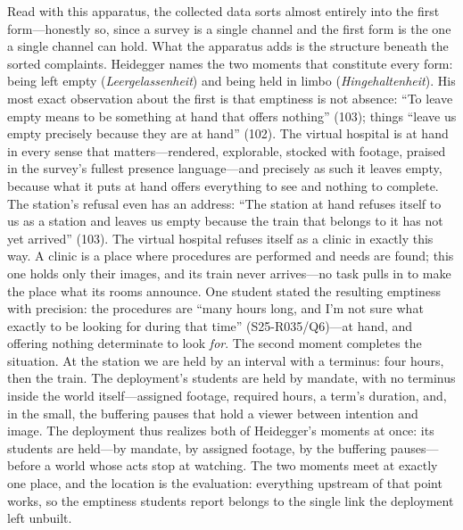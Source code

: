 Read with this apparatus, the collected data sorts almost
entirely into the first form---honestly so, since a survey is a
single channel and the first form is the one a single channel can
hold. What the apparatus adds is the structure beneath the sorted
complaints. Heidegger names the two moments that constitute every
form: being left empty (\textit{Leergelassenheit}) and being held in
limbo (\textit{Hingehaltenheit}). His most exact observation about the
first is that emptiness is not absence: ``To leave empty means to be
something at hand that offers nothing'' (103); things ``leave us empty
precisely because they are at hand'' (102). The virtual hospital is at
hand in every sense that matters---rendered, explorable, stocked with
footage, praised in the survey's fullest presence language---and
precisely as such it leaves empty, because what it puts at hand offers
everything to see and nothing to complete. The station's refusal even
has an address: ``The station at hand refuses itself to us as a
station and leaves us empty because the train that belongs to it has
not yet arrived'' (103). The virtual hospital refuses itself as a
clinic in exactly this way. A clinic is a place where procedures are
performed and needs are found; this one holds only their images, and
its train never arrives---no task pulls in to make the place what its
rooms announce. One student stated the resulting emptiness with
precision: the procedures are ``many hours long, and I'm not sure what
exactly to be looking for during that time'' (S25-R035/Q6)---at hand,
and offering nothing determinate to look \textit{for}. The second
moment completes the situation. At the station we are held by an
interval with a terminus: four hours, then the train. The deployment's
students are held by mandate, with no terminus inside the world
itself---assigned footage, required hours, a term's duration, and, in
the small, the buffering pauses that hold a viewer between intention
and image. The deployment thus realizes both of Heidegger's moments at
once: its students are held---by mandate, by assigned footage, by the
buffering pauses---before a world whose acts stop at watching. The two
moments meet at exactly one place, and the location is the evaluation:
everything upstream of that point works, so the emptiness students
report belongs to the single link the deployment left unbuilt.

